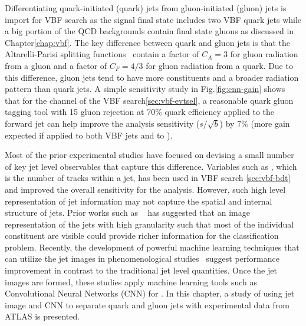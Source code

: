 Differentiating quark-initiated (quark) jets from gluon-initiated (gluon) jets is import for VBF \Hbb search as the signal final state includes two VBF quark jets while a big portion of the QCD backgrounds contain final state gluons as discussed in Chapter\ref{chap:vbf}. The key difference between quark and gluon jets is that the Altarelli-Parisi splitting functions~\cite{Altarelli:1977zs} contain a factor of $C_A=3$ for gluon radiation from a gluon and a factor of $C_F=4/3$ for gluon radiation from a quark. Due to this difference, gluon jets tend to have more constituents and a broader radiation pattern than quark jets. A simple sensitivity study in Fig.\ref{fig:cnn-gain} shows that for the \twocentral channel of the VBF \Hbb search\ref{sec:vbf-evtsel}, a reasonable quark gluon tagging tool with 15 gluon rejection at 70\% quark efficiency applied to the forward jet can help improve the analysis sensitivity ($s/\sqrt{b}$) by $7\%$ (more gain expected if applied to both VBF jets and to \fourcentral).

Most of the prior experimental studies have focused on devising a small number of key jet level observables that capture this difference. Variables such as \ntrk, which is the number of tracks within a jet, has been used in VBF \Hbb search \ref{sec:vbf-bdt} and improved the overall sensitivity for the analysis. However, such high level representation of jet information may not capture the spatial and internal structure of jets. Prior works such as ~\cite{deOliveira:2015xxd} has suggested that an image representation of the jets with high granularity such that most of the individual constituent are visible could provide richer information for the classification problem. Recently, the development of powerful machine learning techniques that can utilize the jet images in phenomenological studies~\cite{Komiske:2016rsd,Dery:2017fap} suggest \qgtagging performance improvement in contrast to the traditional jet level quantities. Once the jet images are formed, these studies apply machine learning tools such as Convolutional Neural Networks (CNN) for \qgtagging. In this chapter, a study of using jet image and CNN to separate quark and gluon jets with experimental data from ATLAS is presented. 


